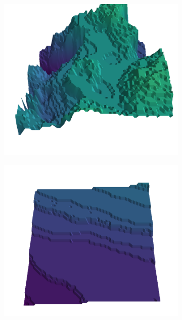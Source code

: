 \begin{figure}[H]
    \begin{subfigure}[b]{0.19\textwidth}
        \includegraphics[width=\linewidth]{../img/5/quarry/false_positive//patch-3d-majavi-colormap-2.png}
    \end{subfigure}
    \begin{subfigure}[b]{0.19\textwidth}
        \includegraphics[width=\linewidth]{../img/5/quarry/false_positive//patch-3d-majavi-colormap-3.png}
    \end{subfigure}  

\end{figure}
